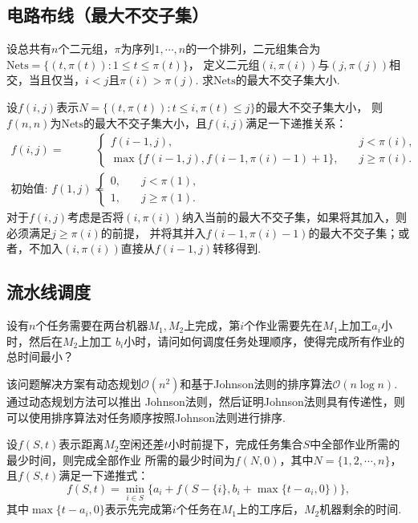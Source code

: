 \documentclass[12pt, a4paper, oneside]{ctexart}
\numberwithin{equation}{section}  %
\theoremstyle{definition}
\let\leq=\leqslant %
\let\geq=\geqslant %
\def\O{\mathcal{O}}         %
\begin{document}
\subsection{电路布线（最大不交子集）}
设总共有$n$个二元组，$\pi$为序列$1,\cdots, n$的一个排列，二元组集合为$\text{Nets}=\{(t,\pi(t)):1\leq t\leq \pi(t)\}$，
定义二元组$(i,\pi(i))$与$(j,\pi(j))$相交，当且仅当，$i < j$且$\pi(i) > \pi(j)$. 求$\text{Nets}$的最大不交子集大小.

设$f(i, j)$表示$N=\{(t, \pi(t)):t\leq i,\pi(t)\leq j\}$的最大不交子集大小，
则$f(n,n)$为$\text{Nets}$的最大不交子集大小，且$f(i,j)$满足一下递推关系：
\begin{align*}
    f(i, j) =&\ \begin{cases}
        f(i-1, j),&\quad j < \pi(i),\\
        \max\{f(i-1,j), f(i-1, \pi(i)-1)+1\},&\quad j \geq \pi(i).
    \end{cases}\\
    \text{初始值: }f(1, j) =&\ \begin{cases}
        0, &\quad j < \pi(1),\\
        1, &\quad j \geq \pi(1).
    \end{cases}
\end{align*}
对于$f(i,j)$考虑是否将$(i,\pi(i))$纳入当前的最大不交子集，如果将其加入，则必须满足$j\geq \pi(i)$的前提，
并将其并入$f(i-1,\pi(i)-1)$的最大不交子集；或者，不加入$(i,\pi(i))$直接从$f(i-1,j)$转移得到.
\subsection{流水线调度}
设有$n$个任务需要在两台机器$M_1,M_2$上完成，第$i$个作业需要先在$M_1$上加工$a_i$小时，然后在$M_2$上加工
$b_i$小时，请问如何调度任务处理顺序，使得完成所有作业的总时间最小？

该问题解决方案有动态规划$\O(n^2)$和基于Johnson法则的排序算法$\O(n\log n)$. 通过动态规划方法可以推出
Johnson法则，然后证明Johnson法则具有传递性，则可以使用排序算法对任务顺序按照Johnson法则进行排序.

设$f(S, t)$表示距离$M_2$空闲还差$t$小时前提下，完成任务集合$S$中全部作业所需的最少时间，则完成全部作业
所需的最少时间为$f(N, 0)$，其中$N = \{1,2,\cdots,n\}$，且$f(S,t)$满足一下递推式：
\begin{equation*}
    f(S, t) = \min_{i\in S}\{a_i + f(S-\{i\}, b_i+\max\{t-a_i,0\})\},
\end{equation*}
其中$\max\{t-a_i, 0\}$表示先完成第$i$个任务在$M_1$上的工序后，$M_2$机器剩余的时间.
\end{document}
